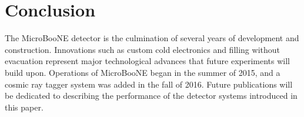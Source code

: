 \section{Conclusion}
\label{sec:conclusion}

The MicroBooNE detector is the culmination of several years of development and construction.  Innovations such as custom cold electronics and filling without evacuation represent major technological advances that future experiments will build upon.  Operations of MicroBooNE began in the summer of 2015, and a cosmic ray tagger system was added in the fall of 2016.  Future publications will be dedicated to describing the performance of the detector systems introduced in this paper.
